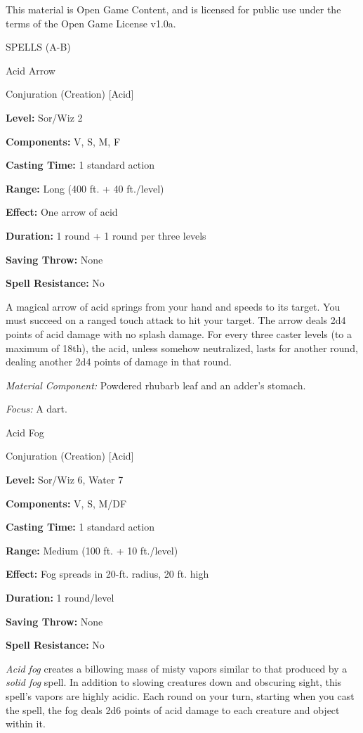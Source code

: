 \documentclass{article}
\begin{document}
This material is Open Game Content, and is licensed for public use under the terms 
of the Open Game License v1.0a.

{\LARGE{}SPELLS (A-B)}

\vspace{12pt}
Acid Arrow

Conjuration (Creation) [Acid]

\textbf{Level:} Sor/Wiz 2

\textbf{Components:} V, S, M, F

\textbf{Casting Time:} 1 standard action

\textbf{Range:} Long (400 ft. + 40 ft./level)

\textbf{Effect:} One arrow of acid

\textbf{Duration:} 1 round + 1 round per three levels

\textbf{Saving Throw:} None

\textbf{Spell Resistance:} No

A magical arrow of acid springs from your hand and speeds to its target. You must 
succeed on a ranged touch attack to hit your target. The arrow deals 2d4 points 
of acid damage with no splash damage. For every three caster levels (to a maximum 
of 18th), the acid, unless somehow neutralized, lasts for another round, dealing 
another 2d4 points of damage in that round.

\textit{Material Component: }Powdered rhubarb leaf and an adder's stomach.

\textit{Focus: }A dart.

\vspace{12pt}
Acid Fog

Conjuration (Creation) [Acid]

\textbf{Level:} Sor/Wiz 6, Water 7

\textbf{Components:} V, S, M/DF

\textbf{Casting Time:} 1 standard action

\textbf{Range: }Medium (100 ft. + 10 ft./level)

\textbf{Effect:} Fog spreads in 20-ft. radius, 20 ft. high

\textbf{Duration:} 1 round/level

\textbf{Saving Throw:} None

\textbf{Spell Resistance:} No

\textit{Acid fog }creates a billowing mass of misty vapors similar to that produced 
by a \textit{solid fog }spell. In addition to slowing creatures down and obscuring 
sight, this spell's vapors are highly acidic. Each round on your turn, starting 
when you cast the spell, the fog deals 2d6 points of acid damage to each creature 
and object within it.
\end{document}
